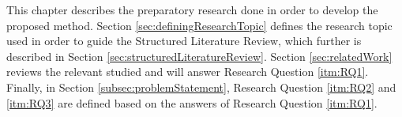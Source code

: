 This chapter describes the preparatory research done in order to develop the proposed method. Section \vref{sec:definingResearchTopic} defines the research topic used in order to guide the Structured Literature Review\citep{kofod2014}, which further is described in Section \vref{sec:structuredLiteratureReview}. Section \vref{sec:relatedWork} reviews the relevant studied and will answer Research Question \vref{itm:RQ1}. Finally, in Section \vref{subsec:problemStatement}, Research Question \vref{itm:RQ2} and \vref{itm:RQ3} are defined based on the answers of Research Question \vref{itm:RQ1}.  